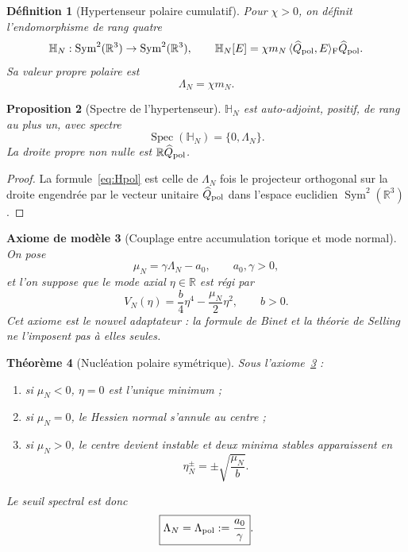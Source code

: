 \documentclass[11pt,a4paper]{article}
\newtheorem{theorem}{Théorème}[section]
\newtheorem{proposition}[theorem]{Proposition}
\newtheorem{definition}[theorem]{Définition}
\newtheorem{axiom}[theorem]{Axiome de modèle}
\newcommand{\R}{\mathbb R}
\begin{document}
\begin{definition}[Hypertenseur polaire cumulatif]\label{def:Hpol}
Pour $\chi>0$, on définit l'endomorphisme de rang quatre
\begin{equation}\label{eq:Hpol}
 \mathbb H_N:\operatorname{Sym}^2(\R^3)\to\operatorname{Sym}^2(\R^3),
 \qquad
 \mathbb H_N[E]
 =\chi m_N\,\langle\widehat Q_{\rm pol},E\rangle_{\rm F}\widehat Q_{\rm pol}.
\end{equation}
Sa valeur propre polaire est
\[
 \Lambda_N=\chi m_N.
\]
\end{definition}

\begin{proposition}[Spectre de l'hypertenseur]
$\mathbb H_N$ est auto-adjoint, positif, de rang au plus un, avec spectre
\[
 \operatorname{Spec}(\mathbb H_N)=\{0,\Lambda_N\}.
\]
La droite propre non nulle est $\R\widehat Q_{\rm pol}$.
\end{proposition}

\begin{proof}
La formule~\eqref{eq:Hpol} est celle de $\Lambda_N$ fois le projecteur orthogonal sur la droite engendrée par le vecteur unitaire $\widehat Q_{\rm pol}$ dans l'espace euclidien $\operatorname{Sym}^2(\R^3)$.
\end{proof}

\begin{axiom}[Couplage entre accumulation torique et mode normal]\label{ax:polar-coupling}
On pose
\begin{equation}\label{eq:muN}
 \mu_N=\gamma\Lambda_N-a_0,
 \qquad a_0,\gamma>0,
\end{equation}
et l'on suppose que le mode axial $\eta\in\R$ est régi par
\begin{equation}\label{eq:Vpolar}
 V_N(\eta)=\frac b4\eta^4-\frac{\mu_N}{2}\eta^2,
 \qquad b>0.
\end{equation}
Cet axiome est le nouvel adaptateur : la formule de Binet et la théorie de Selling ne l'imposent pas à elles seules.
\end{axiom}

\begin{theorem}[Nucléation polaire symétrique]\label{thm:polar-nucleation}
Sous l'axiome~\ref{ax:polar-coupling} :
\begin{enumerate}[label=\textup{(\roman*)}]
\item si $\mu_N<0$, $\eta=0$ est l'unique minimum ;
\item si $\mu_N=0$, le Hessien normal s'annule au centre ;
\item si $\mu_N>0$, le centre devient instable et deux minima stables apparaissent en
\begin{equation}\label{eq:poles}
 \eta_N^\pm=\pm\sqrt{\frac{\mu_N}{b}}.
\end{equation}
\end{enumerate}
Le seuil spectral est donc
\begin{equation}\label{eq:LambdaCrit}
 \boxed{\Lambda_N=\Lambda_{\rm pol}:=\frac{a_0}{\gamma}}.
\end{equation}
\end{theorem}
\end{document}
